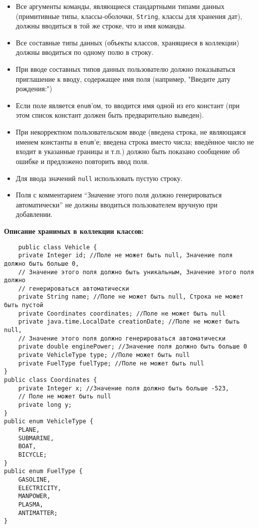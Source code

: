 \begin{itemize}
\item Все аргументы команды, являющиеся стандартными типами данных
(примитивные типы, классы-оболочки, \texttt{String}, классы для хранения дат),
должны вводиться в той же строке, что и имя команды.
\item Все составные типы данных (объекты классов, хранящиеся в коллекции)
должны вводиться по одному полю в строку.
\item При вводе составных типов данных пользователю должно показываться приглашение к вводу,
содержащее имя поля (например, "Введите дату рождения:")
\item Если поле является \texttt{enum}'ом, то вводится имя одной из его констант 
(при этом список констант должен быть предварительно выведен).
\item При некорректном пользовательском вводе
(введена строка, не являющаяся именем константы в \texttt{enum}'е; введена строка вместо числа;
введённое число не входит в указанные границы и т.п.) должно быть показано сообщение об ошибке и
предложено повторить ввод поля.
\item Для ввода значений \texttt{null} использовать пустую строку.
\item Поля с комментарием ``Значение этого поля должно генерироваться автоматически''
 не должны вводиться пользователем вручную при добавлении.
\end{itemize}

\textbf{Описание хранимых в коллекции классов:}

\begin{verbatim}
    public class Vehicle {
    private Integer id; //Поле не может быть null, Значение поля должно быть больше 0,
    // Значение этого поля должно быть уникальным, Значение этого поля должно
    // генерироваться автоматически
    private String name; //Поле не может быть null, Строка не может быть пустой
    private Coordinates coordinates; //Поле не может быть null
    private java.time.LocalDate creationDate; //Поле не может быть null,
    // Значение этого поля должно генерироваться автоматически
    private double enginePower; //Значение поля должно быть больше 0
    private VehicleType type; //Поле может быть null
    private FuelType fuelType; //Поле не может быть null
}
public class Coordinates {
    private Integer x; //Значение поля должно быть больше -523,
    // Поле не может быть null
    private long y;
}
public enum VehicleType {
    PLANE,
    SUBMARINE,
    BOAT,
    BICYCLE;
}
public enum FuelType {
    GASOLINE,
    ELECTRICITY,
    MANPOWER,
    PLASMA,
    ANTIMATTER;
}
\end{verbatim}
